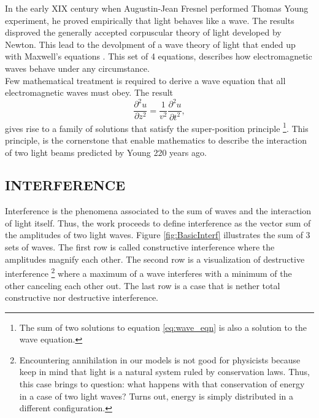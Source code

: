\label{sec:TEO_FRAMEWORK}
In the early XIX century when Augustin-Jean Fresnel performed Thomas Young experiment, he proved empirically that light behaves like a wave. The results disproved the generally accepted corpuscular theory of light developed by Newton. This lead to the devolpment of a wave theory of light that ended up with Maxwell's equations \cite{maxwell1954electricity}. This set of 4 equations, describes how electromagnetic waves behave under any circumstance. \\

Few mathematical treatment is required to derive a wave equation that all electromagnetic waves must obey. The result 
\begin{equation}
    \frac{\partial^2 u}{\partial z^2} = \frac{1}{v^2}\frac{\partial^2 u}{\partial t^2},
    \label{eq:wave_eqn}
\end{equation}
 gives rise to a family of solutions that satisfy the super-position principle \footnote{The sum of two solutions to equation \ref{eq:wave_eqn} is also a solution to the wave equation.}. This principle, is the cornerstone that enable mathematics to describe the interaction of two light beams predicted by Young 220 years ago.  

\subsection{INTERFERENCE}
Interference is the phenomena associated to the sum of waves and the interaction of light itself. Thus, the work proceeds to define interference as the vector sum of the amplitudes of two light waves. Figure \ref{fig:BasicInterf} illustrates the sum of 3 sets of waves. The first row is called constructive interference where the amplitudes magnify each other. The second row is a visualization of destructive interference \footnote{Encountering annihilation in our models is not good for physicists because keep in mind that light is a natural system ruled by conservation laws. Thus, this case brings to question: what happens with that conservation of energy in a case of two light waves? Turns out, energy is simply distributed in a different configuration.}  where a maximum of a wave interferes with a minimum of the other canceling each other out. The last row is a case that is nether total constructive nor destructive interference. \\

